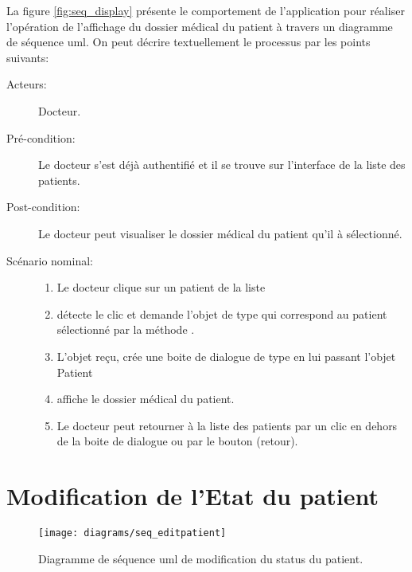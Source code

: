 La figure \ref{fig:seq_display} présente le comportement de l'application pour réaliser l'opération de l'affichage du dossier médical du patient à travers un diagramme de séquence \gls{uml}. On peut décrire textuellement le processus par les points suivants:

\begin{description}

\item[Acteurs:] Docteur.

\item[Pré-condition:] Le docteur s'est déjà authentifié et il se trouve sur l'interface de la liste des patients.

\item[Post-condition:] Le docteur peut visualiser le dossier médical du patient qu'il à sélectionné.

\item[Scénario nominal:]

\begin{enumerate}

\item Le docteur clique sur un patient de la liste

\item {} détecte le clic et demande l'objet de type  qui correspond au patient sélectionné par la méthode .

\item L'objet  reçu,  crée une boite de  dialogue de type  en lui passant l'objet Patient

\item {} affiche le dossier médical du patient.

\item Le docteur peut retourner à la liste des patients par un clic en dehors de la boite de dialogue ou par le bouton (retour).

\end{enumerate}

\end{description}

\section{Modification de l'Etat du patient}

\begin{figure}
\center
\texttt{[image: diagrams/seq\_editpatient]}
\caption{Diagramme de séquence \gls{uml} de modification du status du patient.}
\label{fig:seq_edit}
\end{figure}

